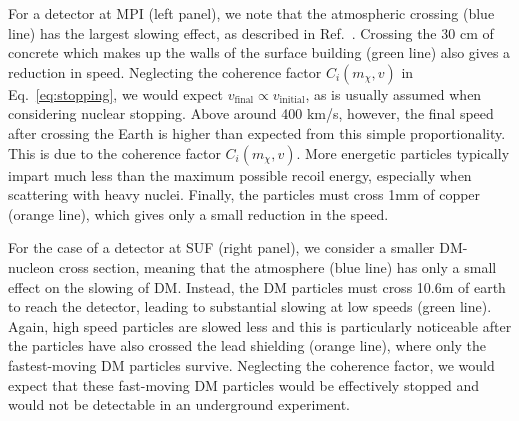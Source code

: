 \documentclass[prd,twocolumn,showpacs,nofootinbib,aps]{revtex4-1}
\begin{document}
For a detector at MPI (left panel), we note that the atmospheric crossing (blue line) has the largest slowing effect, as described in Ref.~\cite{Davis:2017noy}. Crossing the 30 cm of concrete which makes up the walls of the surface building (green line) also gives a reduction in speed. Neglecting the coherence factor $C_i(m_\chi, v)$ in Eq.~\eqref{eq:stopping}, we would expect $v_\mathrm{final} \propto v_\mathrm{initial}$, as is usually assumed when considering nuclear stopping. Above around 400 km/s, however, the final speed after crossing the Earth is higher than expected from this simple proportionality. This is due to the coherence factor $C_i(m_\chi, v)$. More energetic particles typically impart much less than the maximum possible recoil energy, especially when scattering with heavy nuclei. Finally, the particles must cross 1mm of copper (orange line), which gives only a small reduction in the speed. 


 
 For the case of a detector at SUF (right panel), we consider a smaller DM-nucleon cross section, meaning that the atmosphere (blue line) has only a small effect on the slowing of DM.  Instead, the DM particles must cross 10.6m of earth to reach the detector, leading to substantial slowing at low speeds (green line). Again, high speed particles are slowed less and this is particularly noticeable after the particles have also crossed the lead shielding (orange line), where only the fastest-moving DM particles survive. Neglecting the coherence factor, we would expect that these fast-moving DM particles would be effectively stopped and would not be detectable in an underground experiment.
 

\end{document}
